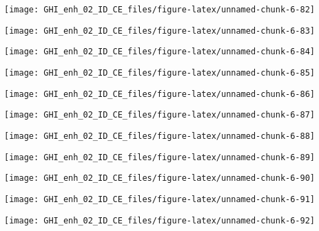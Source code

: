 \documentclass[
  10pt,
  a4paper,oneside]{article}
\begin{document}
\begin{center}\texttt{[image: GHI\_enh\_02\_ID\_CE\_files/figure-latex/unnamed-chunk-6-82]} \end{center}

\begin{center}\texttt{[image: GHI\_enh\_02\_ID\_CE\_files/figure-latex/unnamed-chunk-6-83]} \end{center}

\begin{center}\texttt{[image: GHI\_enh\_02\_ID\_CE\_files/figure-latex/unnamed-chunk-6-84]} \end{center}

\begin{center}\texttt{[image: GHI\_enh\_02\_ID\_CE\_files/figure-latex/unnamed-chunk-6-85]} \end{center}

\begin{center}\texttt{[image: GHI\_enh\_02\_ID\_CE\_files/figure-latex/unnamed-chunk-6-86]} \end{center}

\begin{center}\texttt{[image: GHI\_enh\_02\_ID\_CE\_files/figure-latex/unnamed-chunk-6-87]} \end{center}

\begin{center}\texttt{[image: GHI\_enh\_02\_ID\_CE\_files/figure-latex/unnamed-chunk-6-88]} \end{center}

\begin{center}\texttt{[image: GHI\_enh\_02\_ID\_CE\_files/figure-latex/unnamed-chunk-6-89]} \end{center}

\begin{center}\texttt{[image: GHI\_enh\_02\_ID\_CE\_files/figure-latex/unnamed-chunk-6-90]} \end{center}

\begin{center}\texttt{[image: GHI\_enh\_02\_ID\_CE\_files/figure-latex/unnamed-chunk-6-91]} \end{center}

\begin{center}\texttt{[image: GHI\_enh\_02\_ID\_CE\_files/figure-latex/unnamed-chunk-6-92]} \end{center}
\end{document}
